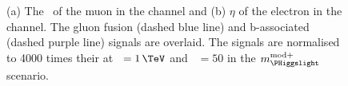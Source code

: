 \begin{figure}[h!]
\begin{center}
\end{center}
\caption[The \pT~of the muon in the \mutau channel
and $\eta$ of the electron in the \etau channel, with the signal
overlaid.]{(a) The \pT~of the muon in the \mutau channel and (b) $\eta$ of the electron in the \etau channel.
The gluon fusion (dashed blue line)
and b-associated (dashed purple line) signals are overlaid. The signals are normalised to 4000 times their
\xsbr at \mA~$=1\,\TeV$ and \tanb~$=50$ in the $m_{\PHiggslight}^{\text{mod+}}$ scenario.}
\label{fig:mt_muonpt}
\end{figure}
 
